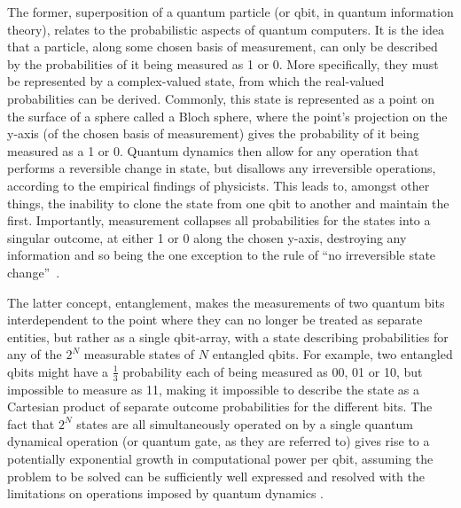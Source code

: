 \documentclass[msc,lith,english]{liuthesis}
\begin{document}
The former, superposition of a quantum particle (or qbit, in quantum information theory), relates to the probabilistic aspects of quantum computers. It is the idea that a particle, along some chosen basis of measurement, can only be described by the probabilities of it being measured as 1 or 0. More specifically, they must be represented by a complex-valued state, from which the real-valued probabilities can be derived. Commonly, this state is represented as a point on the surface of a sphere called a Bloch sphere, where the point's projection on the y-axis (of the chosen basis of measurement) gives the probability of it being measured as a 1 or 0. Quantum dynamics then allow for any operation that performs a reversible change in state, but disallows any irreversible operations, according to the empirical findings of physicists. This leads to, amongst other things, the inability to clone the state from one qbit to another and maintain the first. Importantly, measurement collapses all probabilities for the states into a singular outcome, at either 1 or 0 along the chosen y-axis, destroying any information and so being the one exception to the rule of ``no irreversible state change''~\cite{QCQI}.

The latter concept, entanglement, makes the measurements of two quantum bits interdependent to the point where they can no longer be treated as separate entities, but rather as a single qbit-array, with a state describing probabilities for any of the $2^N$ measurable states of $N$ entangled qbits. For example, two entangled qbits might have a $\frac{1}{3}$ probability each of being measured as 00, 01 or 10, but impossible to measure as 11, making it impossible to describe the state as a Cartesian product of separate outcome probabilities for the different bits. The fact that $2^N$ states are all simultaneously operated on by a single quantum dynamical operation (or quantum gate, as they are referred to) gives rise to a potentially exponential growth in computational power per qbit, assuming the problem to be solved can be sufficiently well expressed and resolved with the limitations on operations imposed by quantum dynamics \cite{QCQI, EIQC}. 
\end{document}
